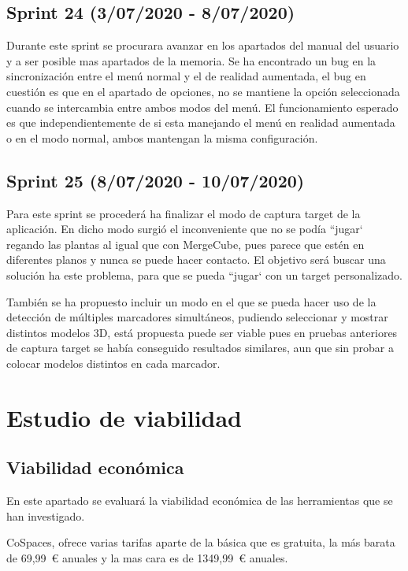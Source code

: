 \subsection{Sprint 24 (3/07/2020 - 8/07/2020)} 
 Durante este sprint se procurara avanzar en los apartados del manual del usuario y a ser posible mas apartados de la memoria.
 Se ha encontrado un bug en la sincronización entre el menú normal y el de realidad aumentada, el bug en cuestión es que en el apartado de opciones, no se mantiene la opción seleccionada cuando se intercambia entre ambos modos del menú. El funcionamiento esperado es que independientemente de si esta manejando el menú en realidad aumentada o en el modo normal, ambos mantengan la misma configuración.
 
 \subsection{Sprint 25 (8/07/2020 - 10/07/2020)} 
 Para este sprint se procederá ha finalizar el modo de captura target de la aplicación. En dicho modo surgió el inconveniente que no se podía ``jugar` regando las plantas al igual que con  MergeCube, pues parece que estén en diferentes planos y nunca se puede hacer contacto. El objetivo será buscar una solución ha este problema, para que se pueda ``jugar`  con un target personalizado. 
 
 También se ha propuesto incluir un modo en el que se pueda hacer uso de la detección de múltiples marcadores simultáneos, pudiendo seleccionar y mostrar distintos modelos 3D, está propuesta puede ser viable pues en pruebas anteriores de captura target se había conseguido resultados similares, aun que sin probar a colocar modelos distintos en cada marcador.

\section{Estudio de viabilidad}

\subsection{Viabilidad económica}

En este apartado se evaluará la viabilidad económica de las herramientas que se han investigado.


CoSpaces, ofrece varias tarifas aparte de la básica que es gratuita, la más barata de 69,99~\euro{}  anuales y la mas cara es de 1349,99~\euro{} anuales.

